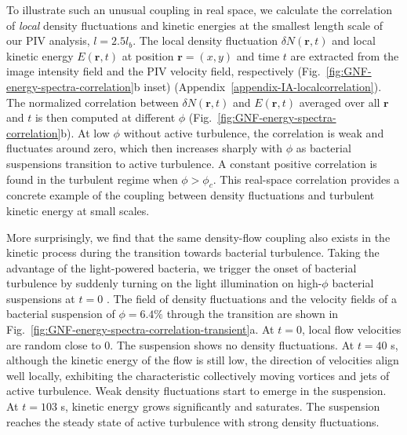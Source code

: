 \documentclass[twocolumn,aps,prx,amsmath,amssymb,longbibliography]{revtex4-2}
\begin{document}
To illustrate such an unusual coupling in real space, we calculate the correlation of \emph{local} density fluctuations and kinetic energies at the smallest length scale of our PIV analysis, $l = 2.5l_b$. The local density fluctuation $\delta N(\bm{r},t)$ and local kinetic energy $E(\bm{r},t)$ at position $\bm{r} = (x,y)$ and time $t$ are extracted from the image intensity field and the PIV velocity field, respectively (Fig.~\ref{fig:GNF-energy-spectra-correlation}b inset) (Appendix~\ref{appendix-IA-localcorrelation}).
The normalized correlation between $\delta N(\bm{r},t)$ and $E(\bm{r},t)$ averaged over all $\bm{r}$ and $t$ is then computed at different $\phi$ (Fig.~\ref{fig:GNF-energy-spectra-correlation}b). At low $\phi$ without active turbulence, the correlation is weak and fluctuates around zero, which then increases sharply with $\phi$ as bacterial suspensions transition to active turbulence. A constant positive correlation is found in the turbulent regime when $\phi > \phi_c$. This real-space correlation provides a concrete example of the coupling between density fluctuations and turbulent kinetic energy at small scales.



More surprisingly, we find that the same density-flow coupling also exists in the kinetic process during the transition towards bacterial turbulence. Taking the advantage of the light-powered bacteria, we trigger the onset of bacterial turbulence by suddenly turning on the light illumination on high-$\phi$ bacterial suspensions at $t=0$ \cite{Peng2020}.
The field of density fluctuations and the velocity fields of a bacterial suspension of $\phi = 6.4\%$ through the transition are shown in Fig.~\ref{fig:GNF-energy-spectra-correlation-transient}a. At $t=0$, local flow velocities are random close to 0. The suspension shows no density fluctuations. At $t=40$ s, although the kinetic energy of the flow is still low, the direction of velocities align well locally, exhibiting the characteristic collectively moving vortices and jets of active turbulence. Weak density fluctuations start to emerge in the suspension. At $t=103$ s, kinetic energy grows significantly and saturates. The suspension reaches the steady state of active turbulence with strong density fluctuations.
\end{document}
